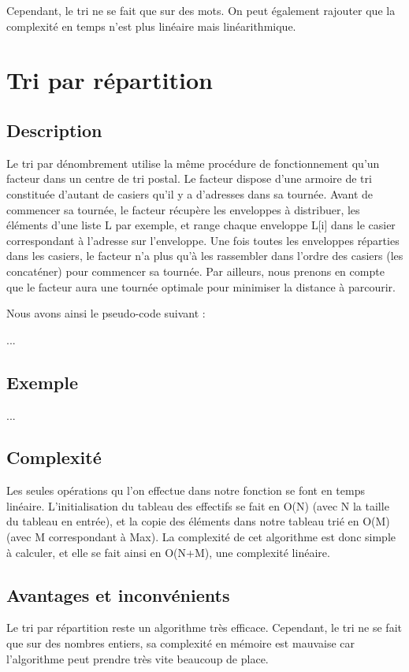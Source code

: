 \documentclass[11pt]{article}
\begin{document}
Cependant, le tri ne se fait que sur des mots. On peut également rajouter que la complexité en temps n'est plus linéaire mais linéarithmique. 

\newpage

\section{Tri par répartition}
\subsection{Description}

\hspace{1.0 cm} Le tri par dénombrement utilise la même procédure de fonctionnement qu’un facteur dans un centre de tri postal. Le facteur dispose d'une armoire de tri constituée d'autant de casiers qu'il y a d'adresses dans sa tournée.
Avant de commencer sa tournée, le facteur récupère les enveloppes à distribuer, les éléments d’une liste L par exemple, et range chaque enveloppe L[i] dans le casier correspondant à l'adresse sur l'enveloppe. Une fois toutes les enveloppes réparties dans les casiers, le facteur n'a plus qu'à les rassembler dans l'ordre des casiers (les concaténer) pour commencer sa tournée. Par ailleurs, nous prenons en compte que le facteur aura une tournée optimale pour minimiser la distance à parcourir.

Nous avons ainsi le pseudo-code suivant :

...

\subsection{Exemple}
...

\subsection{Complexité}
\hspace{1.0 cm} Les seules opérations qu l'on effectue dans notre fonction se font en temps linéaire. L'initialisation du tableau des effectifs se fait en O(N) (avec N la taille du tableau en entrée), et la copie des éléments dans notre tableau trié en O(M) (avec M correspondant à Max). La complexité de cet algorithme est donc simple à calculer, et elle se fait ainsi en O(N+M), une complexité linéaire. 

\subsection{Avantages et inconvénients}
\hspace{1.0 cm} Le tri par répartition reste un algorithme très efficace. Cependant, le tri ne se fait que sur des nombres entiers, sa complexité en mémoire est mauvaise car l'algorithme peut prendre très vite beaucoup de place. 
\end{document}
